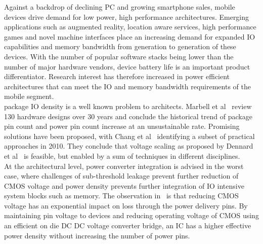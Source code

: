 \documentclass[letterpaper,twocolumn,10pt]{article}
\begin{document}

Against a backdrop of declining PC and growing smartphone sales, mobile devices drive demand for low power, high performance architectures. Emerging applications such as augmented reality, location aware services, high performance games and novel machine interfaces place an increasing demand for expanded IO capabilities and memory bandwidth from generation to generation of these devices. With the number of popular software stacks being lower than the number of major hardware vendors, device battery life is an important product differentiator. Research interest has therefore increased in power efficient architectures that can meet the IO and memory bandwidth requirements of the mobile segment.\\
\indent package IO density is a well known problem to architects. Marbell et al~\cite{Marbell2011} review 130 hardware designs over 30 years and conclude the historical trend of package pin count and power pin count increase at an unsustainable rate. Promising solutions have been proposed, with Chang et al~\cite{Chang2010} identifying a subset of practical approaches in 2010. They conclude that voltage scaling as proposed by Dennard et al~\cite{Dennard1974} is feasible, but enabled by a sum of techniques in different disciplines.\\
At the architectural level, power converter integration is advised in the worst case, where challenges of sub-threshold leakage prevent further reduction of CMOS voltage and power density prevents further integration of IO intensive system blocks such as memory. The observation in~\cite{Chang2010} is that reducing CMOS voltage has an exponential impact on loss through the power delivery pins. By maintaining pin voltage to devices and reducing operating voltage of CMOS using an efficient on die DC DC voltage converter bridge, an IC has a higher effective power density without increasing the number of power pins.\\
\end{document}

